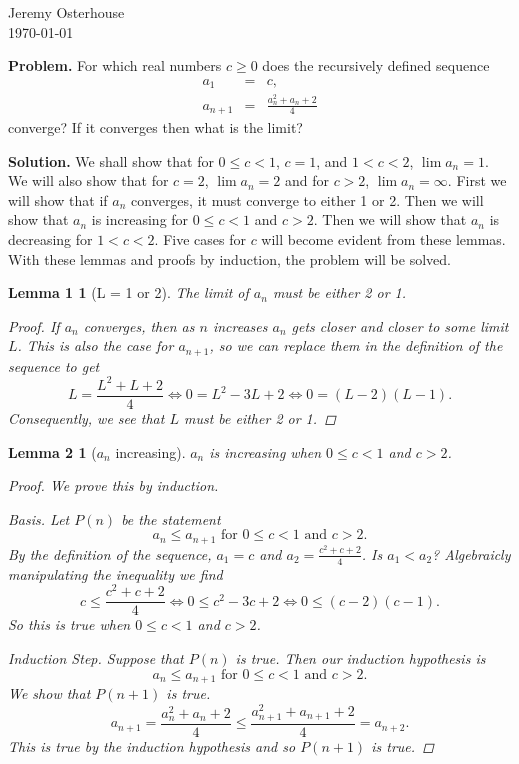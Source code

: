 \documentclass[12pt,letterpaper]{article}
\newtheorem*{lemma1}{Lemma 1}
\newtheorem*{lemma2}{Lemma 2}
\begin{document}
\begin{flushright}
\linespread{1}	%
\small \normalsize %
Jeremy Osterhouse \\
\today
\end{flushright}

{\bf Problem.} For which real numbers $c \geq 0$ does the recursively defined sequence
\begin{eqnarray*}
a_1 & = & c, \\
a_{n+1} & = & \frac{a_n^2+a_n+2}{4}
\end{eqnarray*}
converge? If it converges then what is the limit? 

{\bf Solution.} We shall show that for $0 \leq c < 1$, $c = 1$, and $1<c<2$, $\lim{a_n}=1$. We will also show that for $c=2$, $\lim{a_n}=2$ and for $c>2$, $\lim{a_n}=\infty$. First we will show that if $a_n$ converges, it must converge to either 1 or 2. Then we will show that $a_n$ is increasing for $0 \leq c < 1$ and $c>2$. Then we will show that $a_n$ is decreasing for $1 < c < 2$. Five cases for $c$ will become evident from these lemmas. With these lemmas and proofs by induction, the problem will be solved.

\begin{lemma1}[L = 1 or 2]
The limit of $a_n$ must be either 2 or 1.
\begin{proof}
If $a_n$ converges, then as $n$ increases $a_n$ gets closer and closer to some limit $L$. This is also the case for $a_{n+1}$, so we can replace them in the definition of the sequence to get
\[
L = \frac{L^2+L+2}{4} \iff 0 = L^2 - 3L + 2 \iff 0 = (L-2)(L-1).
\]
Consequently, we see that $L$ must be either 2 or 1. 
\end{proof}
\end{lemma1}

\begin{lemma2}[$a_n$ increasing]
$a_n$ is increasing when $0 \leq c < 1$ and $c > 2$.
\begin{proof}
We prove this by induction. 

\emph{Basis.} Let $P(n)$ be the statement 
\[
a_n \leq a_{n+1} \mbox{ for } 0 \leq c < 1 \mbox{ and } c > 2.
\]
By the definition of the sequence, $a_1 = c$ and $a_2= \frac{c^2+c+2}{4}$. Is $a_1 < a_2$? Algebraicly manipulating the inequality we find
\[ 
c \leq \frac{c^2+c+2}{4} \iff 0 \leq c^2-3c+2 \iff 0 \leq (c-2)(c-1).
\]
So this is true when $0 \leq c < 1$ and $c > 2$.

\emph{Induction Step.} Suppose that $P(n)$ is true. Then our induction hypothesis is
\[
a_n \leq a_{n+1} \mbox{ for } 0 \leq c < 1 \mbox{ and } c > 2.
\]
We show that $P(n+1)$ is true.
\[
a_{n+1} = \frac{a_n^2+a_n+2}{4} \leq \frac{a_{n+1}^2+a_{n+1}+2}{4} = a_{n+2}.
\]
This is true by the induction hypothesis and so $P(n+1)$ is true.
\end{proof}
\end{lemma2}
\end{document}
